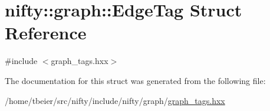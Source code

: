 \hypertarget{structnifty_1_1graph_1_1EdgeTag}{}\section{nifty\+:\+:graph\+:\+:Edge\+Tag Struct Reference}
\label{structnifty_1_1graph_1_1EdgeTag}


{\ttfamily \#include $<$graph\+\_\+tags.\+hxx$>$}



The documentation for this struct was generated from the following file\+:\begin{DoxyCompactItemize}
\item 
/home/tbeier/src/nifty/include/nifty/graph/\hyperlink{graph__tags_8hxx}{graph\+\_\+tags.\+hxx}\end{DoxyCompactItemize}

